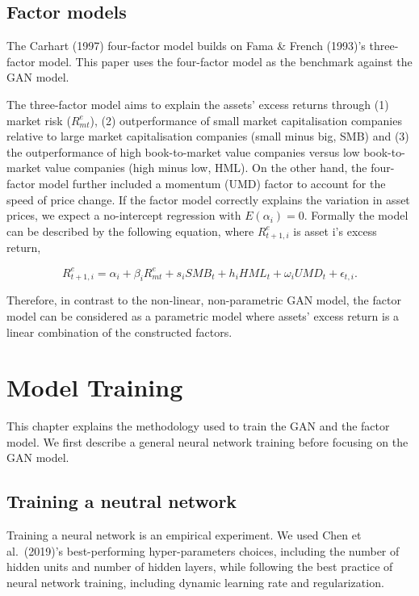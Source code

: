 \documentclass[12pt]{article}
\begin{document}
\hypertarget{factor-models}{%
\subsection{Factor models}\label{factor-models}}

The Carhart (1997) four-factor model builds on
Fama \& French (1993)'s three-factor model. This paper uses the
four-factor model as the benchmark against the GAN model.

The three-factor model aims
to explain the assets' excess returns through (1) market
risk (\(R^e_{mt}\)),
(2) outperformance of small market capitalisation
companies relative to large market capitalisation companies
(small minus big, SMB)
and (3) the outperformance of high book-to-market value
companies versus low book-to-market value companies (high
minus low, HML).
On the other hand, the four-factor model further included a
momentum (UMD) factor to account for the speed of price
change.
If the factor model correctly explains the variation in
asset prices, we expect a no-intercept regression with
\(E(\alpha_i)=0\).
Formally the model can be described by the following
equation, where \(R^e_{t+1, i}\) is asset i's excess return,

\[
R^e_{t+1, i} = \alpha_i + \beta_i R^e_{mt} + s_i SMB_t + h_i HML_t + \omega_i UMD_t + \epsilon_{t, i}.
\]

Therefore, in contrast to the non-linear, non-parametric GAN model,
the factor model can be considered as a
parametric model where assets' excess return is a linear
combination of the constructed factors.

\hypertarget{model_training}{%
\section{Model Training}\label{model_training}}

\thispagestyle{plain}

This chapter explains the methodology used to train the
GAN and the factor model. We first describe a
general neural network training before focusing on the GAN model.

\hypertarget{training-a-neutral-network}{%
\subsection{Training a neutral network}\label{training-a-neutral-network}}

Training a neural network is an empirical experiment.
We used Chen et al.~(2019)'s best-performing
hyper-parameters choices, including the number of hidden
units and number of hidden layers, while following the best
practice of neural network training, including dynamic
learning rate and regularization.
\end{document}
